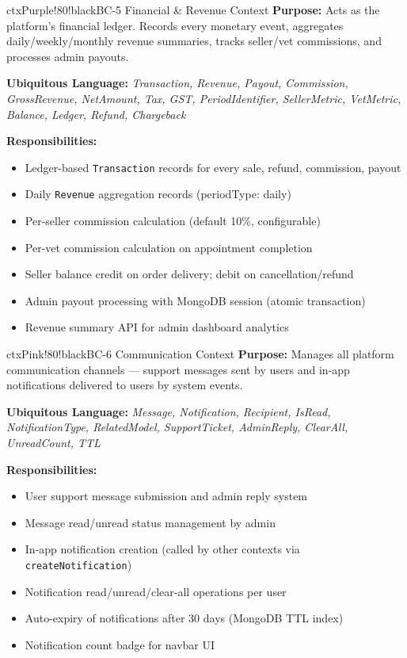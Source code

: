 \documentclass[12pt,a4paper]{article}
\begin{document}
\begin{contextbox}{ctxPurple!80!black}{BC-5 \quad Financial \& Revenue Context}
\textbf{Purpose:} Acts as the platform's financial ledger. Records every monetary event, aggregates daily/weekly/monthly revenue summaries, tracks seller/vet commissions, and processes admin payouts.

\textbf{Ubiquitous Language:} \textit{Transaction, Revenue, Payout, Commission, GrossRevenue, NetAmount, Tax, GST, PeriodIdentifier, SellerMetric, VetMetric, Balance, Ledger, Refund, Chargeback}

\textbf{Responsibilities:}
\begin{itemize}
  \item Ledger-based \texttt{Transaction} records for every sale, refund, commission, payout
  \item Daily \texttt{Revenue} aggregation records (periodType: daily)
  \item Per-seller commission calculation (default 10\%, configurable)
  \item Per-vet commission calculation on appointment completion
  \item Seller balance credit on order delivery; debit on cancellation/refund
  \item Admin payout processing with MongoDB session (atomic transaction)
  \item Revenue summary API for admin dashboard analytics
\end{itemize}
\end{contextbox}

\vspace{0.5em}

\begin{contextbox}{ctxPink!80!black}{BC-6 \quad Communication Context}
\textbf{Purpose:} Manages all platform communication channels — support messages sent by users and in-app notifications delivered to users by system events.

\textbf{Ubiquitous Language:} \textit{Message, Notification, Recipient, IsRead, NotificationType, RelatedModel, SupportTicket, AdminReply, ClearAll, UnreadCount, TTL}

\textbf{Responsibilities:}
\begin{itemize}
  \item User support message submission and admin reply system
  \item Message read/unread status management by admin
  \item In-app notification creation (called by other contexts via \texttt{createNotification})
  \item Notification read/unread/clear-all operations per user
  \item Auto-expiry of notifications after 30 days (MongoDB TTL index)
  \item Notification count badge for navbar UI
\end{itemize}
\end{contextbox}
\end{document}
